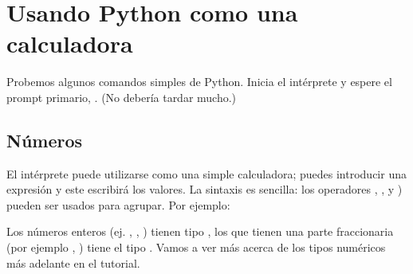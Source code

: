 \documentclass[a5paper,10pt,spanish]{sphinxmanual}
\begin{document}
\section{Usando Python como una calculadora}
\label{\detokenize{tutorial/introduction:using-python-as-a-calculator}}\label{\detokenize{tutorial/introduction:tut-calculator}}
\sphinxAtStartPar
Probemos algunos comandos simples de Python. Inicia el intérprete y espere el prompt primario, \sphinxcode{\sphinxupquote{>>>}}. (No debería tardar mucho.)


\subsection{Números}
\label{\detokenize{tutorial/introduction:numbers}}\label{\detokenize{tutorial/introduction:tut-numbers}}
\sphinxAtStartPar
El intérprete puede utilizarse como una simple calculadora; puedes introducir una expresión y este escribirá los valores. La sintaxis es sencilla: los operadores \sphinxcode{\sphinxupquote{+}}, \sphinxcode{\sphinxupquote{\sphinxhyphen{}}}, \sphinxcode{\sphinxupquote{*}} y ) pueden ser usados para agrupar. Por ejemplo:

\begin{sphinxVerbatim}[commandchars=\\\{\}]
  
  
    
    
\end{sphinxVerbatim}

\sphinxAtStartPar
Los números enteros (ej. , , ) tienen tipo , los que tienen una parte fraccionaria (por ejemplo , ) tiene el tipo . Vamos a ver más acerca de los tipos numéricos más adelante en el tutorial.
\end{document}
